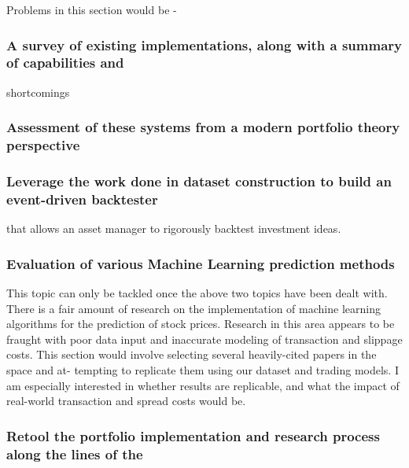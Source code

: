 \documentclass[11pt,preprint, authoryear]{elsarticle}
\numberwithin{equation}{section}
\numberwithin{figure}{section}
\numberwithin{table}{section}
\begin{document}
Problems in this section would be -

\subsubsection{A survey of existing implementations, along with a
summary of capabilities
and}\label{a-survey-of-existing-implementations-along-with-a-summary-of-capabilities-and}

shortcomings

\subsubsection{Assessment of these systems from a modern portfolio
theory
perspective}\label{assessment-of-these-systems-from-a-modern-portfolio-theory-perspective}

\subsubsection{Leverage the work done in dataset construction to build
an event-driven
backtester}\label{leverage-the-work-done-in-dataset-construction-to-build-an-event-driven-backtester}

that allows an asset manager to rigorously backtest investment ideas.

\subsubsection{Evaluation of various Machine Learning prediction
methods}\label{evaluation-of-various-machine-learning-prediction-methods}

This topic can only be tackled once the above two topics have been dealt
with. There is a fair amount of research on the implementation of
machine learning algorithms for the prediction of stock prices. Research
in this area appears to be fraught with poor data input and inaccurate
modeling of transaction and slippage costs. This section would involve
selecting several heavily-cited papers in the space and at- tempting to
replicate them using our dataset and trading models. I am especially
interested in whether results are replicable, and what the impact of
real-world transaction and spread costs would be.

\subsubsection{Retool the portfolio implementation and research process
along the lines of
the}\label{retool-the-portfolio-implementation-and-research-process-along-the-lines-of-the}
\end{document}
